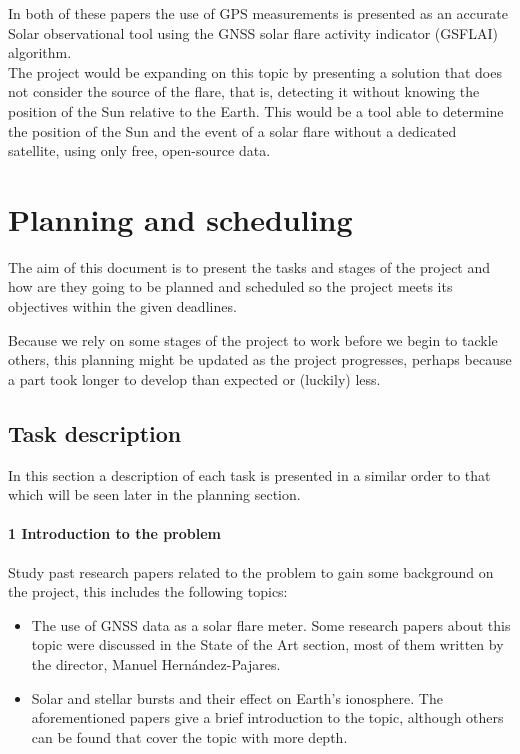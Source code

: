 In both of these papers the use of GPS measurements is presented as an accurate Solar observational tool using the GNSS solar flare activity indicator (GSFLAI) algorithm.\\

The project would be expanding on this topic by presenting a solution that does not consider the source of the flare, that is, detecting it without knowing the position of the Sun relative to the Earth. This would be a tool able to determine the position of the Sun and the event of a solar flare without a dedicated satellite, using only free, open-source data.

\section{Planning and scheduling}

The aim of this document is to present the tasks and stages of the project and how are they going to be planned and scheduled so the project meets its objectives within the given deadlines.

Because we rely on some stages of the project to work before we begin to tackle others, this planning might be updated as the project progresses, perhaps because a part took longer to develop than expected or (luckily) less.

\subsection{Task description}

In this section a description of each task is presented in a similar order to that which will be seen later in the planning section.

\paragraph{1 Introduction to the problem}

Study past research papers related to the problem to gain some background on the project, this includes the following topics:

\begin{itemize}
  \item The use of GNSS data as a solar flare meter. Some research papers about this topic were discussed in the State of the Art section, most of them written by the director, Manuel Hernández-Pajares. \cite{hernandez2012gnss}
  \item Solar and stellar bursts and their effect on Earth’s ionosphere. The aforementioned papers give a brief introduction to the topic, although others can be found that cover the topic with more depth. \cite{mitra1974ionospheric}
\end{itemize}

